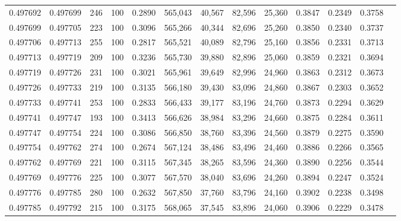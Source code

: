 \begin{tabular}{rrrrrrrrrrrrr}
0.497692 & 0.497699 &   246 & 100 &                                     0.2890 & 565,043 &  40,567 &  82,596 &  25,360 & 0.3847 & 0.2349 & 0.3758 \\
0.497699 & 0.497705 &   223 & 100 &                                     0.3096 & 565,266 &  40,344 &  82,696 &  25,260 & 0.3850 & 0.2340 & 0.3737 \\
0.497706 & 0.497713 &   255 & 100 &                                     0.2817 & 565,521 &  40,089 &  82,796 &  25,160 & 0.3856 & 0.2331 & 0.3713 \\
0.497713 & 0.497719 &   209 & 100 &                                     0.3236 & 565,730 &  39,880 &  82,896 &  25,060 & 0.3859 & 0.2321 & 0.3694 \\
0.497719 & 0.497726 &   231 & 100 &                                     0.3021 & 565,961 &  39,649 &  82,996 &  24,960 & 0.3863 & 0.2312 & 0.3673 \\
0.497726 & 0.497733 &   219 & 100 &                                     0.3135 & 566,180 &  39,430 &  83,096 &  24,860 & 0.3867 & 0.2303 & 0.3652 \\
0.497733 & 0.497741 &   253 & 100 &                                     0.2833 & 566,433 &  39,177 &  83,196 &  24,760 & 0.3873 & 0.2294 & 0.3629 \\
0.497741 & 0.497747 &   193 & 100 &                                     0.3413 & 566,626 &  38,984 &  83,296 &  24,660 & 0.3875 & 0.2284 & 0.3611 \\
0.497747 & 0.497754 &   224 & 100 &                                     0.3086 & 566,850 &  38,760 &  83,396 &  24,560 & 0.3879 & 0.2275 & 0.3590 \\
0.497754 & 0.497762 &   274 & 100 &                                     0.2674 & 567,124 &  38,486 &  83,496 &  24,460 & 0.3886 & 0.2266 & 0.3565 \\
0.497762 & 0.497769 &   221 & 100 &                                     0.3115 & 567,345 &  38,265 &  83,596 &  24,360 & 0.3890 & 0.2256 & 0.3544 \\
0.497769 & 0.497776 &   225 & 100 &                                     0.3077 & 567,570 &  38,040 &  83,696 &  24,260 & 0.3894 & 0.2247 & 0.3524 \\
0.497776 & 0.497785 &   280 & 100 &                                     0.2632 & 567,850 &  37,760 &  83,796 &  24,160 & 0.3902 & 0.2238 & 0.3498 \\
0.497785 & 0.497792 &   215 & 100 &                                     0.3175 & 568,065 &  37,545 &  83,896 &  24,060 & 0.3906 & 0.2229 & 0.3478 \\

\end{tabular}
